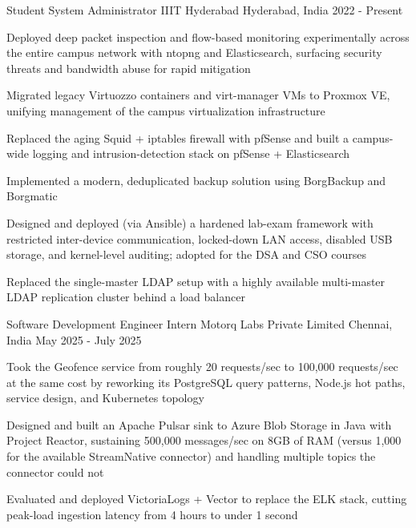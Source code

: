 
\begin{cventries}

  \cventry
    {Student System Administrator} %
    {IIIT Hyderabad} %
    {Hyderabad, India} %
    {2022 - Present} %
    {
      \begin{cvitems} %
        \item {Deployed deep packet inspection and flow-based monitoring experimentally across the entire campus network with ntopng and Elasticsearch, surfacing security threats and bandwidth abuse for rapid mitigation}
        \item {Migrated legacy Virtuozzo containers and virt-manager VMs to Proxmox VE, unifying management of the campus virtualization infrastructure}
        \item {Replaced the aging Squid + iptables firewall with pfSense and built a campus-wide logging and intrusion-detection stack on pfSense + Elasticsearch}
        \item {Implemented a modern, deduplicated backup solution using BorgBackup and Borgmatic}
        \item {Designed and deployed (via Ansible) a hardened lab-exam framework with restricted inter-device communication, locked-down LAN access, disabled USB storage, and kernel-level auditing; adopted for the DSA and CSO courses}
        \item {Replaced the single-master LDAP setup with a highly available multi-master LDAP replication cluster behind a load balancer}
      \end{cvitems}
    }

  \cventry
    {Software Development Engineer Intern} %
    {Motorq Labs Private Limited} %
    {Chennai, India} %
    {May 2025 - July 2025} %
    {
      \begin{cvitems} %
        \item {Took the Geofence service from roughly 20 requests/sec to 100,000 requests/sec at the same cost by reworking its PostgreSQL query patterns, Node.js hot paths, service design, and Kubernetes topology}
        \item {Designed and built an Apache Pulsar sink to Azure Blob Storage in Java with Project Reactor, sustaining 500,000 messages/sec on 8GB of RAM (versus 1,000 for the available StreamNative connector) and handling multiple topics the connector could not}
        \item {Evaluated and deployed VictoriaLogs + Vector to replace the ELK stack, cutting peak-load ingestion latency from 4 hours to under 1 second}
      \end{cvitems}
    }


\end{cventries}
